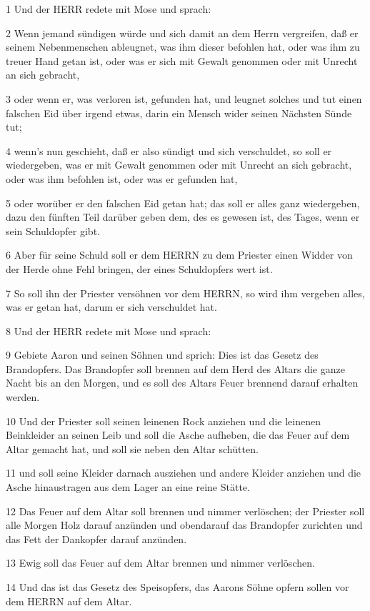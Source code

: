 \par 1 Und der HERR redete mit Mose und sprach:
\par 2 Wenn jemand sündigen würde und sich damit an dem Herrn vergreifen, daß er seinem Nebenmenschen ableugnet, was ihm dieser befohlen hat, oder was ihm zu treuer Hand getan ist, oder was er sich mit Gewalt genommen oder mit Unrecht an sich gebracht,
\par 3 oder wenn er, was verloren ist, gefunden hat, und leugnet solches und tut einen falschen Eid über irgend etwas, darin ein Mensch wider seinen Nächsten Sünde tut;
\par 4 wenn's nun geschieht, daß er also sündigt und sich verschuldet, so soll er wiedergeben, was er mit Gewalt genommen oder mit Unrecht an sich gebracht, oder was ihm befohlen ist, oder was er gefunden hat,
\par 5 oder worüber er den falschen Eid getan hat; das soll er alles ganz wiedergeben, dazu den fünften Teil darüber geben dem, des es gewesen ist, des Tages, wenn er sein Schuldopfer gibt.
\par 6 Aber für seine Schuld soll er dem HERRN zu dem Priester einen Widder von der Herde ohne Fehl bringen, der eines Schuldopfers wert ist.
\par 7 So soll ihn der Priester versöhnen vor dem HERRN, so wird ihm vergeben alles, was er getan hat, darum er sich verschuldet hat.
\par 8 Und der HERR redete mit Mose und sprach:
\par 9 Gebiete Aaron und seinen Söhnen und sprich: Dies ist das Gesetz des Brandopfers. Das Brandopfer soll brennen auf dem Herd des Altars die ganze Nacht bis an den Morgen, und es soll des Altars Feuer brennend darauf erhalten werden.
\par 10 Und der Priester soll seinen leinenen Rock anziehen und die leinenen Beinkleider an seinen Leib und soll die Asche aufheben, die das Feuer auf dem Altar gemacht hat, und soll sie neben den Altar schütten.
\par 11 und soll seine Kleider darnach ausziehen und andere Kleider anziehen und die Asche hinaustragen aus dem Lager an eine reine Stätte.
\par 12 Das Feuer auf dem Altar soll brennen und nimmer verlöschen; der Priester soll alle Morgen Holz darauf anzünden und obendarauf das Brandopfer zurichten und das Fett der Dankopfer darauf anzünden.
\par 13 Ewig soll das Feuer auf dem Altar brennen und nimmer verlöschen.
\par 14 Und das ist das Gesetz des Speisopfers, das Aarons Söhne opfern sollen vor dem HERRN auf dem Altar.
